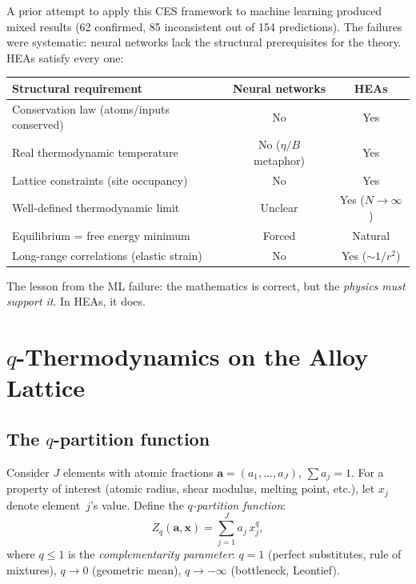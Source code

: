 \documentclass[12pt,letterpaper]{article}
\theoremstyle{definition}
\begin{document}
A prior attempt to apply this CES framework to machine learning produced mixed results (62 confirmed, 85 inconsistent out of 154 predictions).  The failures were systematic: neural networks lack the structural prerequisites for the theory.  HEAs satisfy every one:

\begin{center}
\begin{tabular}{@{}lcc@{}}
\toprule
\textbf{Structural requirement} & \textbf{Neural networks} & \textbf{HEAs} \\
\midrule
Conservation law (atoms/inputs conserved) & No & Yes \\
Real thermodynamic temperature & No ($\eta/B$ metaphor) & Yes \\
Lattice constraints (site occupancy) & No & Yes \\
Well-defined thermodynamic limit & Unclear & Yes ($N \to \infty$) \\
Equilibrium = free energy minimum & Forced & Natural \\
Long-range correlations (elastic strain) & No & Yes ($\sim 1/r^2$) \\
\bottomrule
\end{tabular}
\end{center}

The lesson from the ML failure: the mathematics is correct, but the \emph{physics must support it}.  In HEAs, it does.

\section{$q$-Thermodynamics on the Alloy Lattice}

\subsection{The $q$-partition function}

Consider $J$ elements with atomic fractions $\mathbf{a} = (a_1, \ldots, a_J)$, $\sum a_j = 1$.  For a property of interest (atomic radius, shear modulus, melting point, etc.), let $x_j$ denote element~$j$'s value.  Define the \emph{$q$-partition function}:
\begin{equation}\label{eq:Zq}
  Z_q(\mathbf{a}, \mathbf{x}) = \sum_{j=1}^{J} a_j \, x_j^q,
\end{equation}
where $q \leq 1$ is the \emph{complementarity parameter}: $q = 1$ (perfect substitutes, rule of mixtures), $q \to 0$ (geometric mean), $q \to -\infty$ (bottleneck, Leontief).
\end{document}
